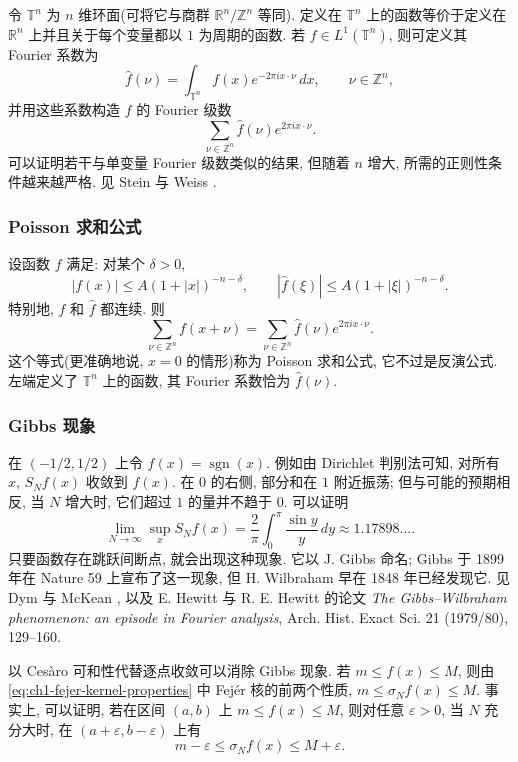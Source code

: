 令 $\mathbb T^n$ 为 $n$ 维环面(可将它与商群 $\mathbb R^n/\mathbb Z^n$ 等同). 定义在 $\mathbb T^n$ 上的函数等价于定义在 $\mathbb R^n$ 上并且关于每个变量都以 $1$ 为周期的函数. 若 $f\in L^1(\mathbb T^n)$, 则可定义其 Fourier 系数为
\[
 \widehat f(\nu)=\int_{\mathbb T^n}f(x)e^{-2\pi ix\cdot\nu}\,dx,
 \qquad \nu\in\mathbb Z^n,
\]
并用这些系数构造 $f$ 的 Fourier 级数
\[
 \sum_{\nu\in\mathbb Z^n}\widehat f(\nu)e^{2\pi ix\cdot\nu}.
\]
可以证明若干与单变量 Fourier 级数类似的结果, 但随着 $n$ 增大, 所需的正则性条件越来越严格. 见 Stein 与 Weiss .

\subsubsection{Poisson 求和公式}
\label{subsec:ch1-poisson-summation-formula}

设函数 $f$ 满足: 对某个 $\delta>0$,
\[
 |f(x)|\le A(1+|x|)^{-n-\delta},
 \qquad
 |\widehat f(\xi)|\le A(1+|\xi|)^{-n-\delta}.
\]
特别地, $f$ 和 $\widehat f$ 都连续. 则
\hypertarget{chapter-01-page-033}{}
\[
 \sum_{\nu\in\mathbb Z^n}f(x+\nu)
 =\sum_{\nu\in\mathbb Z^n}\widehat f(\nu)e^{2\pi ix\cdot\nu}.
\]
这个等式(更准确地说, $x=0$ 的情形)称为 Poisson 求和公式, 它不过是反演公式. 左端定义了 $\mathbb T^n$ 上的函数, 其 Fourier 系数恰为 $\widehat f(\nu)$.

\subsubsection{Gibbs 现象}
\label{subsec:ch1-gibbs-phenomenon}

在 $(-1/2,1/2)$ 上令 $f(x)=\operatorname{sgn}(x)$. 例如由 Dirichlet 判别法可知, 对所有 $x$, $S_Nf(x)$ 收敛到 $f(x)$. 在 $0$ 的右侧, 部分和在 $1$ 附近振荡; 但与可能的预期相反, 当 $N$ 增大时, 它们超过 $1$ 的量并不趋于 $0$. 可以证明
\[
 \lim_{N\to\infty}\sup_xS_Nf(x)
 =\frac2\pi\int_0^\pi\frac{\sin y}{y}\,dy
 \approx1.17898\ldots.
\]
只要函数存在跳跃间断点, 就会出现这种现象. 它以 J. Gibbs 命名; Gibbs 于 1899 年在 Nature 59 上宣布了这一现象, 但 H. Wilbraham 早在 1848 年已经发现它. 见 Dym 与 McKean , 以及 E. Hewitt 与 R. E. Hewitt 的论文 \emph{The Gibbs--Wilbraham phenomenon: an episode in Fourier analysis}, Arch. Hist. Exact Sci. 21 (1979/80), 129--160.

以 Cesàro 可和性代替逐点收敛可以消除 Gibbs 现象. 若 $m\le f(x)\le M$, 则由 \eqref{eq:ch1-fejer-kernel-properties} 中 Fejér 核的前两个性质, $m\le\sigma_Nf(x)\le M$. 事实上, 可以证明, 若在区间 $(a,b)$ 上 $m\le f(x)\le M$, 则对任意 $\varepsilon>0$, 当 $N$ 充分大时, 在 $(a+\varepsilon,b-\varepsilon)$ 上有
\[
 m-\varepsilon\le\sigma_Nf(x)\le M+\varepsilon.
\]

